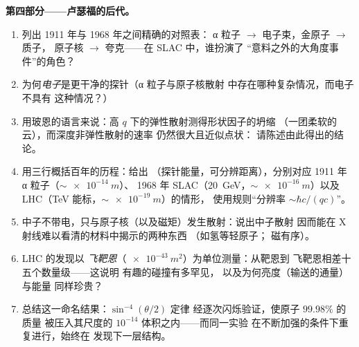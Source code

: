 \begin{problem}
\medskip\noindent\textbf{第四部分——卢瑟福的后代。}
\begin{enumerate}[resume]
  \item 列出 1911 年与 1968 年之间精确的对照表：
        α 粒子 $\to$ 电子束，金原子 $\to$ 质子，
        原子核 $\to$ 夸克——在 SLAC 中，谁扮演了
        “意料之外的大角度事件”的角色？
  \item 为何\emph{电子}是更干净的探针（α 粒子与原子核散射
        中存在哪种复杂情况，而电子不具有
        这种情况？）
  \item 用玻恩的语言来说：高 $q$ 下的弹性散射测得形状因子的坍缩
        （一团柔软的云），而深度非弹性散射的速率
        仍然很大且近似点状：
        请陈述由此得出的结论。
  \item 用三行概括百年的历程：给出
        （探针能量，可分辨距离），分别对应 1911 年 α 粒子（$\sim\qty{e-14}{m}$）、
        1968 年 SLAC（\qty{20}{GeV}，$\sim\qty{e-16}{m}$）以及
        LHC（TeV 能标，$\sim\qty{e-19}{m}$）的情形，
        使用规则“分辨率 $\sim \hbar c/(qc)$”。
  \item 中子不带电，只与原子核（以及磁矩）发生散射：说出中子散射
        因而能在 X 射线难以看清的材料中揭示的两种东西
        （如氢等轻原子；
        磁有序）。
  \item LHC 的发现以
        \emph{飞靶恩}（$\qty{e-43}{m^2}$）为单位测量：从靶恩到
        飞靶恩相差十五个数量级——这说明
        有趣的碰撞有多罕见，
        以及为何亮度（输送的通量）与能量
        同样珍贵？
  \item 总结这一命名结果：$\sin^{-4}(\theta/2)$ 定律
        经逐次闪烁验证，使原子 $99.98\%$ 的质量
        被压入其尺度的 $10^{-14}$ 体积之内——而同一实验
        在不断加强的条件下重复进行，始终在
        发现下一层结构。
\end{enumerate}
\end{problem}
